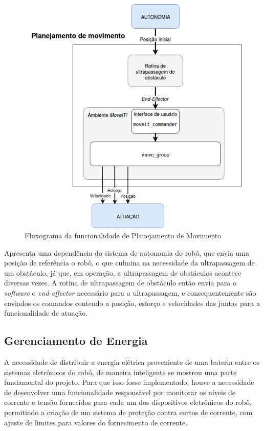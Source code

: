 \begin{figure}[H]
	\centering
	\includegraphics[scale=0.4]{Figures/motion_plan_funcPORTUGUES.png}
	\caption{Fluxograma da funcionalidade de Planejamento de Movimento}
	\label{fig:fluxo_motion}
\end{figure}

		
Apresenta uma dependência do sistema de autonomia do robô, que envia uma posição de referência o robô, o que culmina na necessidade da ultrapassagem de um obstáculo, já que, em operação, a ultrapassagem de obstáculos acontece diversas vezes. A rotina de ultrapassagem de obstáculo então envia para o \textit{software} o \textit{end-effector} necessário para a ultrapassagem, e consequentemente são enviados os comandos contendo  a posição, esforço e velocidades das juntas para a funcionalidade de atuação.

\subsection{Gerenciamento de Energia}\label{sec:geren_ener} 
A necessidade de distribuir a energia elétrica proveniente de uma bateria entre os sistemas eletrônicos do robô, de maneira inteligente se mostrou uma parte fundamental do projeto. Para que isso fosse implementado, houve a necessidade de desenvolver uma funcionalidade responsável por monitorar os níveis de corrente e tensão fornecidos para cada um dos dispositivos eletrônicos do robô, permitindo a criação de um sistema de proteção contra surtos de corrente, com ajuste de limites para valores do fornecimento de corrente.

